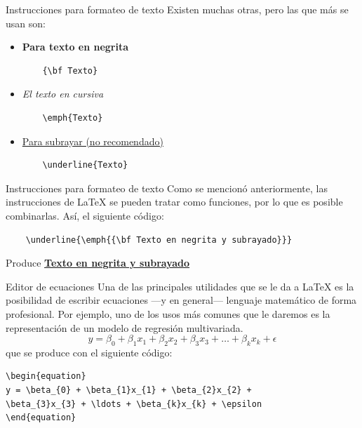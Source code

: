 \documentclass[compress,svgnames]{beamer}
\begin{document}
\begin{frame}[fragile]{Instrucciones para formateo de texto}
Existen muchas otras, pero las que más se usan son:
\begin{itemize}
	\item {\bf Para texto en negrita}
	\begin{lstlisting}
	{\bf Texto}
	\end{lstlisting}
	\item \emph{El texto en cursiva}
	\begin{lstlisting}
	\emph{Texto}
	\end{lstlisting}
	\item \underline{Para subrayar (no recomendado)}
	\begin{lstlisting}
	\underline{Texto}
	\end{lstlisting}
\end{itemize}
\end{frame}

\begin{frame}[fragile]{Instrucciones para formateo de texto}
	Como se mencionó anteriormente, las instrucciones de \LaTeX{} se pueden tratar como funciones, por lo que es posible combinarlas. Así, el siguiente código:
	\begin{lstlisting}
	\underline{\emph{{\bf Texto en negrita y subrayado}}}
	\end{lstlisting} 
	Produce {\bf \underline{Texto en negrita y subrayado}}	
\end{frame}

\begin{frame}[fragile]{Editor de ecuaciones}
Una de las principales utilidades que se le da a \LaTeX{} es la posibilidad de escribir ecuaciones ---y en general--- lenguaje matemático de forma profesional. Por ejemplo, uno de los usos más comunes que le daremos es la representación de un modelo de regresión multivariada.
\begin{equation}
y = \beta_{0} + \beta_{1}x_{1} + \beta_{2}x_{2} + \beta_{3}x_{3} + \ldots + \beta_{k}x_{k} + \epsilon 
\end{equation}
que se produce con el siguiente código:
\begin{lstlisting}
\begin{equation}
y = \beta_{0} + \beta_{1}x_{1} + \beta_{2}x_{2} + 
\beta_{3}x_{3} + \ldots + \beta_{k}x_{k} + \epsilon 
\end{equation}
\end{lstlisting}
\end{frame}
\end{document}
